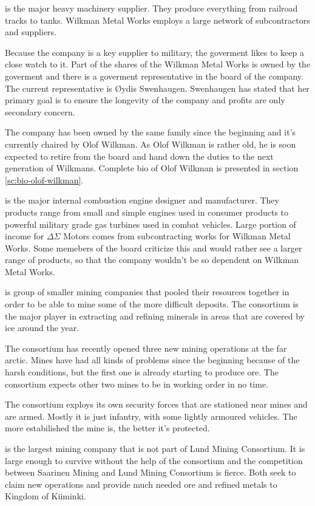 \documentclass{tufte-book}
\begin{document}
 is the major heavy machinery supplier. They
produce everything from railroad tracks to tanks. Wilkman Metal Works employs
a large network of subcontractors and suppliers.

Because the company is a key supplier to military, the goverment likes to
keep a close watch to it. Part of the shares of the Wilkman Metal Works is
owned by the goverment and there is a goverment representative in the board
of the company. The current representative is \O ydis Swenhaugen. Swenhaugen
has stated that her primary goal is to ensure the longevity of the company
and profits are only secondary concern.

The company has been owned by the same family since the beginning and it's
currently chaired by Olof Wilkman. As Olof Wilkman is rather old, he is soon
expected to retire from the board and hand down the duties to the next
generation of Wilkmans. Complete bio of Olof Wilkman is presented in section
\ref{sc:bio-olof-wilkman}.

 is the major internal combustion engine
designer and manufacturer. They products range from small and simple engines
used in consumer products to powerful military grade gas turbines used in
combat vehicles. Large portion of income for $\Delta$$\Sigma$  Motors comes
from subcontracting works for Wilkman Metal Works. Some memebers of the board
criticize this and would rather see a larger range of products, so that the
company wouldn't be so dependent on Wilkman Metal Works.

 is group of smaller mining companies that
pooled their resources together in order to be able to mine some of the
more difficult deposits. The consortium is the major player in extracting and
refining minerals in areas that are covered by ice around the year.

The consortium has recently opened three new mining operations at the far
arctic. Mines have had all kinds of problems since the beginning because of
the harsh conditions, but the first one is already starting to produce ore.
The consortium expects other two mines to be in working order in no time.

The consortium exploys its own security forces that are stationed near mines
and are armed. Mostly it is just infantry, with some lightly armoured
vehicles. The more estabilished the mine is, the better it's protected.

 is the largest mining company that is not part of
Lund Mining Consortium. It is large enough to survive without the help of the
consortium and the competition between Saarinen Mining and Lund Mining
Consortium is fierce. Both seek to claim new operations and provide much
needed ore and refined metals to Kingdom of Kiiminki.
\end{document}
